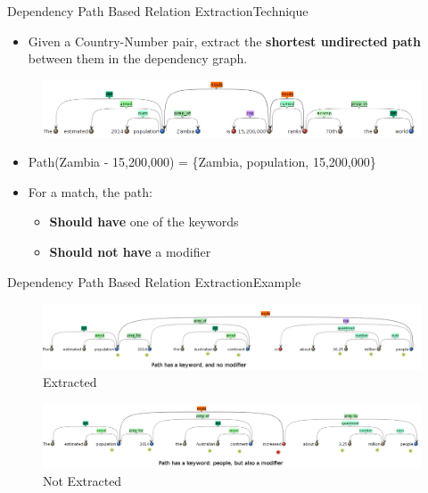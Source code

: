 \documentclass{beamer}
\begin{document}
\begin{frame}{Dependency Path Based Relation Extraction}{Technique}
 
\begin{itemize}
 \item Given a Country-Number pair, extract the \textbf{shortest undirected path} between them in the dependency graph.
\end{itemize}
 \begin{figure}[h]
 \centering
 \includegraphics[bb=0 0 990 149,scale=0.3]{./dep.png}
\end{figure}
\begin{itemize}
 \item Path(Zambia - 15,200,000) = \{Zambia, population, 15,200,000\}
  \item For a match, the path:
  \begin{itemize}
   \item \textbf{Should have} one of the keywords
   \item \textbf{Should not have} a modifier
  \end{itemize}
 \end{itemize}
\end{frame}

\begin{frame}{Dependency Path Based Relation Extraction}{Example}
\begin{figure}[h]
 \centering
 \includegraphics[bb=0 0 1292 228,scale=0.25]{./dep_pos.png}
 \caption*{Extracted}
\end{figure}
\begin{figure}[h]
 \centering
 \includegraphics[bb=0 0 1280 219,scale=0.25]{./dep_neg.png}
 \caption*{Not Extracted}
\end{figure}

\end{frame}
\end{document}
